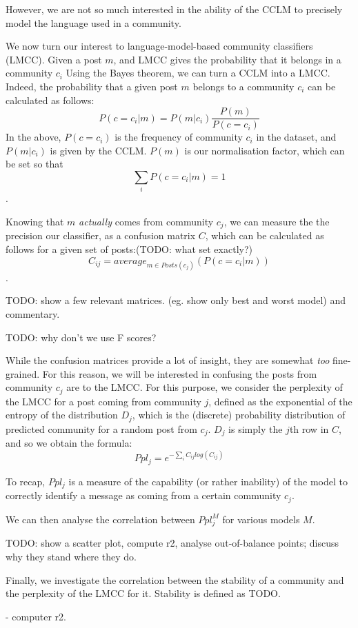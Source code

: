 \documentclass[11pt,a4paper]{article}
\begin{document}
However, we are not so much interested in the ability of the CCLM to
precisely model the language used in a community.

We now turn our interest to language-model-based community classifiers
(LMCC). Given a post $m$, and LMCC gives the probability that it
belongs in a community $c_i$ Using the Bayes theorem, we can turn a
CCLM into a LMCC. Indeed, the probability that a given post $m$
belongs to a community $c_i$ can be calculated as follows:
\[P(c=c_i | m) = P(m | c_i)\frac {P(m)} {P(c=c_i)}\]
In the above,
$P(c=c_i)$ is the frequency of community $c_i$ in the dataset, and
$P(m | c_i)$ is given by the CCLM. $P(m)$ is our normalisation factor, which can be set so that
\[\sum_i P(c=c_i | m) = 1\].

Knowing that $m$ \emph{actually} comes from community $c_j$, we can
measure the the precision our classifier, as a confusion matrix $C$,
which can be calculated as follows for a given set of posts:(TODO: what set exactly?)
\[C_{ij} = average_{m ∈ Posts(c_j)}(P(c=c_i | m))\].

TODO: show a few relevant matrices. (eg. show only best and worst model) and commentary.

TODO: why don't we use F scores?

While the confusion matrices provide a lot of insight, they are
somewhat \emph{too} fine-grained. For this reason, we will be
interested in confusing the posts from community $c_j$ are to the
LMCC. For this purpose, we consider the perplexity of the LMCC for a
post coming from community $j$, defined as the exponential of the
entropy of the distribution \(D_j\), which is the (discrete)
probability distribution of predicted community for a random post from
$c_j$. $D_j$ is simply the $j$th row in \(C\), and so we obtain the formula:
\[Ppl_j = e^{-\sum_i C_{ij} log(C_{ij})}\]

To recap, \(Ppl_j\) is a measure of the capability (or rather
inability) of the model to correctly identify a message as coming from
a certain community $c_j$. 

We can then analyse the correlation between \(Ppl^M_j\) for various models $M$.

TODO: show a scatter plot, compute r2, analyse out-of-balance points; discuss why they stand where they do.


Finally, we investigate the correlation between the stability of a
community and the perplexity of the LMCC for it. Stability is defined as TODO.

- computer r2.
\end{document}
